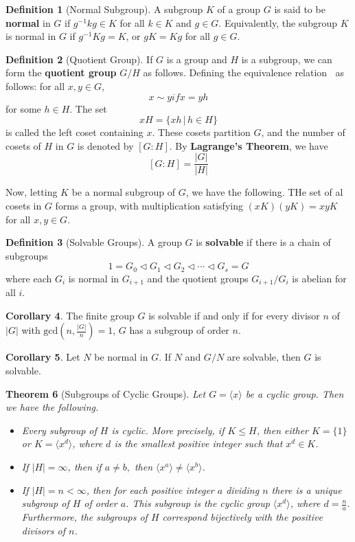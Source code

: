 \documentclass[10pt, oneside, reqno]{amsart}
\theoremstyle{plain}%
\newtheorem{thm}{Theorem}[section]
\theoremstyle{definition}
\newtheorem{defn}[thm]{Definition}
\newtheorem{cor}[thm]{Corollary}
\theoremstyle{remark}
\newcommand{\gener}[1]{\langle #1 \rangle}
\newcommand{\xdeg}[2]{[#1 : #2]}
\begin{document}
\begin{defn}[Normal Subgroup]
    A subgroup $K$ of a group $G$ is said to be \textbf{normal} in $G$ if $g^{-1} k g \in K$ for all $k \in K$ and $g \in G$.  Equivalently, the subgroup $K$ is normal in $G$ if $g^{-1}Kg = K$, or $gK = Kg$ for all $g \in G$.
\end{defn}

\begin{defn}[Quotient Group]
    If $G$ is a group and $H$ is a subgroup, we can form the \textbf{quotient group} $G/H$ as follows.
    Defining the equivalence relation $~$ as follows: for all $x,y \in G$, \[
        x \sim y if x = yh
    \] for some $h \in H$.  The set \[
        xH = \{xh \, | \, h \in H \}
    \] is called the left coset containing $x$.  These cosets partition $G$, and the number of cosets of $H$ in $G$ is denoted by $\xdeg{G}{H}$.  By \textbf{Lagrange's Theorem}, we have \[
        \xdeg{G}{H} = \frac{|G|}{|H|}
    \]
    
    Now, letting $K$ be a normal subgroup of $G$, we have the following.
    THe set of al cosets in $G$ forms a group, with multiplication satisfying $(xK)(yK) = xyK$ for all $x,y \in G$.
\end{defn}


\begin{defn}[Solvable Groups]
    A group $G$ is \textbf{solvable} if there is a chain of subgroups\[
        1 = G_0 \lhd G_1 \lhd G_2 \lhd \cdots \lhd G_s = G
    \] where each $G_i$ is normal in $G_{i+1}$ and the quotient groups $G_{i+1}/G_i$ is abelian for all $i$.
\end{defn}

\begin{cor}
    The finite group $G$ is solvable if and only if for every divisor $n$ of $|G|$ with $\text{gcd}(n, \frac{|G|}{n}) = 1$, $G$ has a subgroup of order $n$.
\end{cor}

\begin{cor} Let $N$ be normal in $G$.
    If $N$ and $G/N$ are solvable, then $G$ is solvable.
\end{cor}


\begin{thm}[Subgroups of Cyclic Groups]
    Let $G = \langle x \rangle$ be a cyclic group.  Then we have the following.
    \begin{itemize}
        \item Every subgroup of $H$ is cyclic.   More precisely, if $K \leq H$, then either $K = \{1\}$ or $K = \langle x^d \rangle$, where $d$ is the smallest positive integer such that $x^d \in K$.
        \item If $|H| = \infty$, then if $a \neq b,$ then $\gener{x^a} \neq \gener{x^b}$. 
        \item If $|H| = n < \infty$, then for each positive integer $a$ dividing $n$ there is a unique subgroup of $H$ of order $a$.  This subgroup is the cyclic group $\gener{x^d}$, where $d = \frac{n}{a}$.  Furthermore, the subgroups of $H$ correspond bijectively with the positive divisors of $n$.
    \end{itemize}
\end{thm}
\end{document}
